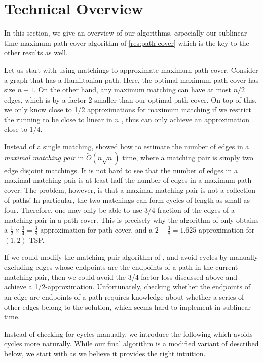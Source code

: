\section{Technical Overview}\label{sec:techniques}

In this section, we give an overview of our algorithms, especially our sublinear time maximum path cover algorithm of \cref{res:path-cover} which is the key to the other results as well.


Let us start with using matchings to approximate maximum path cover. Consider a graph that has a Hamiltonian path. Here, the optimal maximum path cover has size $n-1$. On the other hand, any maximum matching can have at most $n/2$ edges, which is by a factor 2 smaller than our optimal path cover. On top of this, we only know close to 1/2 approximations for maximum matching if we restrict the running to be close to linear in $n$ \cite{behnezhad2021,BehnezhadRRS-ArXiv22}, thus can only achieve an approximation close to 1/4.

Instead of a single matching, \citet*{chen2020} showed how to estimate the number of edges in a {\em maximal matching pair} in $\widetilde{O}(n\sqrt{n})$ time, where a matching pair is simply two edge disjoint matchings. It is not hard to see that the number of edges in a maximal matching pair is at least half the number of edges in a maximum path cover. The problem, however, is that a maximal matching pair is not a collection of paths! In particular, the two matchings can form cycles of length as small as four. Therefore, one may only be able to use 3/4 fraction of the edges of a matching pair in a path cover. This is precisely why the algorithm of \cite{chen2020} only obtains a $\frac{1}{2} \times \frac{3}{4} = \frac{3}{8}$ approximation for path cover, and a $2-\frac{3}{8} = 1.625$ approximation for $(1,2)$-TSP.  

If we could modify the matching pair algorithm of \cite{chen2020}, and avoid cycles by manually excluding edges whose endpoints are the endpoints of a path in the current matching pair, then we could avoid the 3/4 factor loss discussed above and achieve a 1/2-approximation. Unfortunately, checking whether the endpoints of an edge are endpoints of a path requires knowledge about whether a series of other edges belong to the solution, which seems hard to implement in sublinear time. 

Instead of checking for cycles manually, we introduce the following  which avoids cycles more naturally. While our final algorithm is a modified variant of  described below, we start with  as we believe it provides the right intuition.


